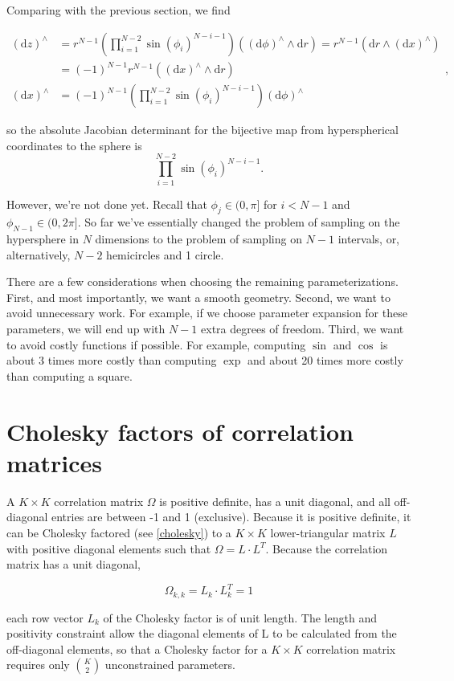 \documentclass[11pt]{article}
\newcommand{\dv}[1]{\mathrm{d}{#1}}
\begin{document}
Comparing with the previous section, we find

\[
\begin{aligned}
    (\dv{z})^\wedge &= r^{N-1} \left(\prod_{i=1}^{N-2} \sin(\phi_i)^{N-i-1}\right) \left((\dv{\phi})^\wedge \wedge \dv{r}\right) = r^{N-1} \left(\dv{r} \wedge (\dv{x})^\wedge \right) \\
    &= (-1)^{N-1} r^{N-1} \left((\dv{x})^\wedge \wedge \dv{r}\right)\\
    (\dv{x})^\wedge &= (-1)^{N-1}\left(\prod_{i=1}^{N-2} \sin(\phi_i)^{N-i-1}\right) (\dv{\phi})^\wedge
\end{aligned},
\]

so the absolute Jacobian determinant for the bijective map from hyperspherical coordinates to the sphere is
\[
    \prod_{i=1}^{N-2} \sin(\phi_i)^{N-i-1}.
\]

However, we're not done yet.
Recall that $\phi_j \in (0, \pi]$ for $i < N-1$ and $\phi_{N-1} \in (0, 2\pi]$.
So far we've essentially changed the problem of sampling on the hypersphere in $N$ dimensions to the problem of sampling on $N-1$ intervals, or, alternatively, $N-2$ hemicircles and 1 circle. 

There are a few considerations when choosing the remaining parameterizations.
First, and most importantly, we want a smooth geometry.
Second, we want to avoid unnecessary work.
For example, if we choose parameter expansion for these parameters, we will end up with $N-1$ extra degrees of freedom.
Third, we want to avoid costly functions if possible.
For example, computing $\sin$ and $\cos$ is about 3 times more costly than computing $\exp$ and about 20 times more costly than computing a square.

\section{Cholesky factors of correlation matrices}

A $K \times K$ correlation matrix $\Omega$ is positive definite, has a unit diagonal, and all off-diagonal entries are between -1 and 1 (exclusive). Because it is positive definite, it can be Cholesky factored (see \ref{cholesky}) to a $K \times K$ lower-triangular matrix $L$
with positive diagonal elements such that $\Omega = L \cdot L^T$. Because the correlation matrix has a unit diagonal,

\[
  \Omega_{k,k} = L_k \cdot L_k^T = 1
\]

each row vector $L_k$ of the Cholesky factor is of unit length. The length and positivity
constraint allow the diagonal elements of L to be calculated from the off-diagonal
elements, so that a Cholesky factor for a $K \times K$ correlation matrix requires only $\binom{K}{2}$ unconstrained parameters.
\end{document}
